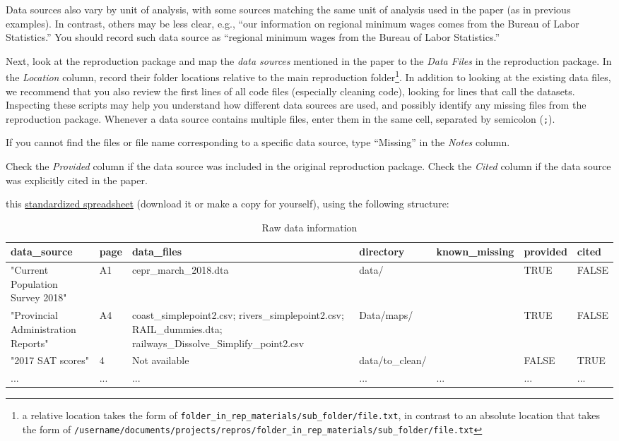 \documentclass[
]{book}
\begin{document}
Data sources also vary by unit of analysis, with some sources matching the same unit of analysis used in the paper (as in previous examples). In contrast, others may be less clear, e.g., ``our information on regional minimum wages comes from the Bureau of Labor Statistics.'' You should record such data source as ``regional minimum wages from the Bureau of Labor Statistics.''

Next, look at the reproduction package and map the \emph{data sources} mentioned in the paper to the \emph{Data Files} in the reproduction package. In the \emph{Location} column, record their folder locations relative to the main reproduction folder\footnote{a relative location takes the form of \texttt{folder\_in\_rep\_materials/sub\_folder/file.txt}, in contrast to an absolute location that takes the form of \texttt{/username/documents/projects/repros/folder\_in\_rep\_materials/sub\_folder/file.txt}}. In addition to looking at the existing data files, we recommend that you also review the first lines of all code files (especially cleaning code), looking for lines that call the datasets. Inspecting these scripts may help you understand how different data sources are used, and possibly identify any missing files from the reproduction package. Whenever a data source contains multiple files, enter them in the same cell, separated by semicolon (\texttt{;}).

If you cannot find the files or file name corresponding to a specific data source, type ``Missing'' in the \emph{Notes} column.

Check the \emph{Provided} column if the data source was included in the original reproduction package. Check the \emph{Cited} column if the data source was explicitly cited in the paper.

this \href{https://docs.google.com/spreadsheets/d/1LUIdVFH0OfR70C7z07TYeE-uWzKI_JIeWUMaYhqEKK0/edit\#gid=0\&range=A1}{standardized spreadsheet} (download it or make a copy for yourself), using the following structure:\\

\begin{table}

\caption{\label{tab:raw-data-information}Raw data information}
\centering
\begin{tabu} to 
\hline
data\_source & page & data\_files & directory & known\_missing & provided & cited\\
\hline
"Current Population Survey 2018" & A1 & cepr\_march\_2018.dta & data/ &  & TRUE & FALSE\\
\hline
"Provincial Administration Reports" & A4 & coast\_simplepoint2.csv; rivers\_simplepoint2.csv; RAIL\_dummies.dta; railways\_Dissolve\_Simplify\_point2.csv & Data/maps/ &  & TRUE & FALSE\\
\hline
"2017 SAT scores" & 4 & Not available & data/to\_clean/ &  & FALSE & TRUE\\
\hline
... & ... & ... & ... & ... & ... & ...\\
\hline
\end{tabu}
\end{table}
\end{document}
